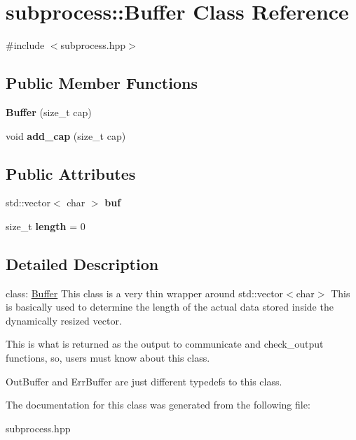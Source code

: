 \hypertarget{classsubprocess_1_1Buffer}{}\section{subprocess\+:\+:Buffer Class Reference}
\label{classsubprocess_1_1Buffer}


{\ttfamily \#include $<$subprocess.\+hpp$>$}

\subsection*{Public Member Functions}
\begin{DoxyCompactItemize}
\item 
\mbox{\label{classsubprocess_1_1Buffer_a1b8663f33bef5aaab50d598735277318}} 
{\bfseries Buffer} (size\+\_\+t cap)
\item 
\mbox{\label{classsubprocess_1_1Buffer_a35d472c265f5e327c2893df2a2cec950}} 
void {\bfseries add\+\_\+cap} (size\+\_\+t cap)
\end{DoxyCompactItemize}
\subsection*{Public Attributes}
\begin{DoxyCompactItemize}
\item 
\mbox{\label{classsubprocess_1_1Buffer_a8e0d10dd27c1354156d6f445ec8a8121}} 
std\+::vector$<$ char $>$ {\bfseries buf}
\item 
\mbox{\label{classsubprocess_1_1Buffer_a44c75d3fa33e08742043c8bd059175b7}} 
size\+\_\+t {\bfseries length} = 0
\end{DoxyCompactItemize}


\subsection{Detailed Description}
class\+: \hyperlink{classsubprocess_1_1Buffer}{Buffer} This class is a very thin wrapper around std\+::vector$<$char$>$ This is basically used to determine the length of the actual data stored inside the dynamically resized vector.

This is what is returned as the output to communicate and check\+\_\+output functions, so, users must know about this class.

Out\+Buffer and Err\+Buffer are just different typedefs to this class. 

The documentation for this class was generated from the following file\+:\begin{DoxyCompactItemize}
\item 
subprocess.\+hpp\end{DoxyCompactItemize}
